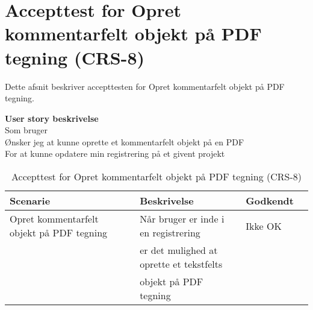 \section{Accepttest for Opret kommentarfelt objekt på PDF tegning (CRS-8)}
Dette afsnit beskriver accepttesten for Opret kommentarfelt objekt på PDF tegning.

\textbf{User story beskrivelse} \\
Som bruger \\
Ønsker jeg at kunne oprette et kommentarfelt objekt på en PDF \\
For at kunne opdatere min registrering på et givent projekt

\begin{table}[H]
	\centering
	\begin{tabular}{|ll|l|ll|} \hline
		\textbf{Scenarie} &  & \textbf{Beskrivelse}&  \textbf{Godkendt}&  \\ \hline
		Opret kommentarfelt objekt på PDF tegning&  &  Når bruger er inde i en registrering &  Ikke OK&  \\
		& & er det mulighed at oprette et tekstfelts & & \\ 
		& & objekt på PDF tegning& & \\ \hline
	\end{tabular}
	\caption{Accepttest for Opret kommentarfelt objekt på PDF tegning (CRS-8)}
	\label{AcceptKommentarfelt}
\end{table}

\clearpage